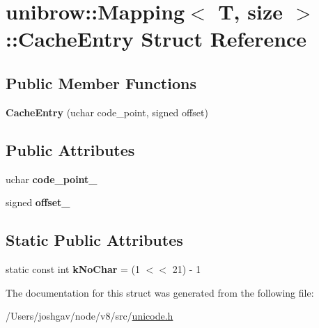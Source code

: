 \hypertarget{structunibrow_1_1_mapping_1_1_cache_entry}{}\section{unibrow\+:\+:Mapping$<$ T, size $>$\+:\+:Cache\+Entry Struct Reference}
\label{structunibrow_1_1_mapping_1_1_cache_entry}
\subsection*{Public Member Functions}
\begin{DoxyCompactItemize}
\item 
{\bfseries Cache\+Entry} (uchar code\+\_\+point, signed offset)\hypertarget{structunibrow_1_1_mapping_1_1_cache_entry_abbc703c0ab248819c2a221ab4d7db11b}{}\label{structunibrow_1_1_mapping_1_1_cache_entry_abbc703c0ab248819c2a221ab4d7db11b}

\end{DoxyCompactItemize}
\subsection*{Public Attributes}
\begin{DoxyCompactItemize}
\item 
uchar {\bfseries code\+\_\+point\+\_\+}\hypertarget{structunibrow_1_1_mapping_1_1_cache_entry_ab9006c7d2053a964c425efb2bc6e3d2b}{}\label{structunibrow_1_1_mapping_1_1_cache_entry_ab9006c7d2053a964c425efb2bc6e3d2b}

\item 
signed {\bfseries offset\+\_\+}\hypertarget{structunibrow_1_1_mapping_1_1_cache_entry_a422b5e511d1ed18c0276abfc4d66b056}{}\label{structunibrow_1_1_mapping_1_1_cache_entry_a422b5e511d1ed18c0276abfc4d66b056}

\end{DoxyCompactItemize}
\subsection*{Static Public Attributes}
\begin{DoxyCompactItemize}
\item 
static const int {\bfseries k\+No\+Char} = (1 $<$$<$ 21) -\/ 1\hypertarget{structunibrow_1_1_mapping_1_1_cache_entry_aa7558ac0f420d64bd3c52d5f625b513e}{}\label{structunibrow_1_1_mapping_1_1_cache_entry_aa7558ac0f420d64bd3c52d5f625b513e}

\end{DoxyCompactItemize}


The documentation for this struct was generated from the following file\+:\begin{DoxyCompactItemize}
\item 
/\+Users/joshgav/node/v8/src/\hyperlink{unicode_8h}{unicode.\+h}\end{DoxyCompactItemize}
